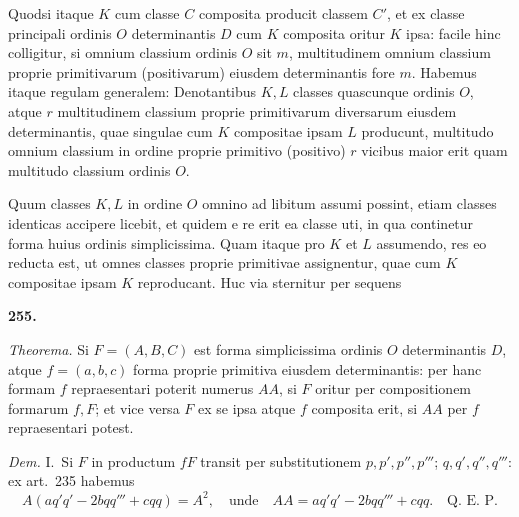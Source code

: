 \documentclass[12pt,a4paper]{article}
\theoremstyle{plain}
\theoremstyle{definition}
\theoremstyle{remark}
\begin{document}
Quodsi itaque $K$ cum classe $C$ composita producit classem $C'$, et ex classe principali ordinis $O$ determinantis $D$ cum $K$ composita oritur $K$ ipsa: facile hinc colligitur, si omnium classium ordinis $O$ sit $m$, multitudinem omnium classium proprie primitivarum (positivarum) eiusdem determinantis fore $m$. Habemus itaque regulam generalem: Denotantibus $K, L$ classes quascunque ordinis $O$, atque $r$ multitudinem classium proprie primitivarum diversarum eiusdem determinantis, quae singulae cum $K$ compositae ipsam $L$ producunt, multitudo omnium classium in ordine proprie primitivo (positivo) $r$ vicibus maior erit quam multitudo classium ordinis $O$.

Quum classes $K, L$ in ordine $O$ omnino ad libitum assumi possint, etiam classes identicas accipere licebit, et quidem e re erit ea classe uti, in qua continetur forma huius ordinis simplicissima. Quam itaque pro $K$ et $L$ assumendo, res eo reducta est, ut omnes classes proprie primitivae assignentur, quae cum $K$ compositae ipsam $K$ reproducant. Huc via sternitur per sequens

\begin{center}\textbf{255.}\end{center}

\textit{Theorema.} Si $F = (A, B, C)$ est forma simplicissima ordinis $O$ determinantis $D$, atque $f = (a, b, c)$ forma proprie primitiva eiusdem determinantis: per hanc formam $f$ repraesentari poterit numerus $AA$, si $F$ oritur per compositionem formarum $f, F$; et vice versa $F$ ex se ipsa atque $f$ composita erit, si $AA$ per $f$ repraesentari potest.

\textit{Dem.} I.\ Si $F$ in productum $fF$ transit per substitutionem $p, p', p'', p'''$; $q, q', q'', q'''$: ex art.\ 235 habemus
\[
A(aq'q' - 2bqq''' + cqq) = A^{2}, \quad \text{unde} \quad AA = aq'q' - 2bqq''' + cqq. \quad \text{Q.\ E.\ P.}
\]
\end{document}
